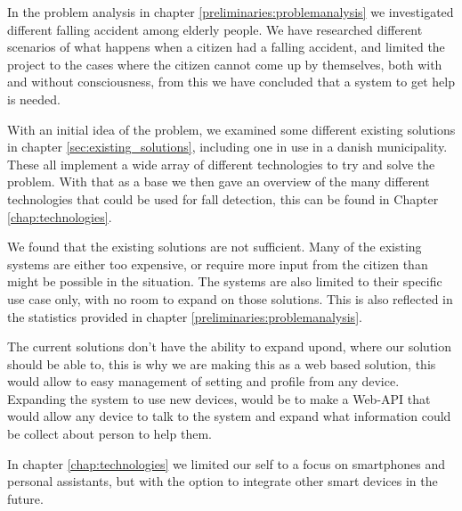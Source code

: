 In the problem analysis in chapter \ref{preliminaries:problemanalysis} we investigated different falling accident among elderly people. We have researched different scenarios of what happens when a citizen had a falling accident, and limited the project to the cases where the citizen cannot come up by themselves, both with and without consciousness, from this we have concluded that a system to get help is needed.

With an initial idea of the problem, we examined some different existing solutions in chapter \ref{sec:existing_solutions}, including one in use in a danish municipality. These all implement a wide array of different technologies to try and solve the problem. With that as a base we then gave an overview of the many different technologies that could be used for fall detection, this can be found in Chapter \ref{chap:technologies}.

We found that the existing solutions are not sufficient. Many of the existing systems are either too expensive, or require more input from the citizen than might be possible in the situation. The systems are also limited to their specific use case only, with no room to expand on those solutions. This is also reflected in the statistics provided in chapter \ref{preliminaries:problemanalysis}.

The current solutions don't have the ability to expand upond, where our solution should be able to, this is why we are making this as a web based solution, this would allow to easy management of setting and profile from any device. Expanding the system to use new devices, would be to make a Web-API that would allow any device to talk to the system and expand what information could be collect about person to help them.

In chapter \ref{chap:technologies} we limited our self to a focus on smartphones and personal assistants, but with the option to integrate other smart devices in the future.

\fi